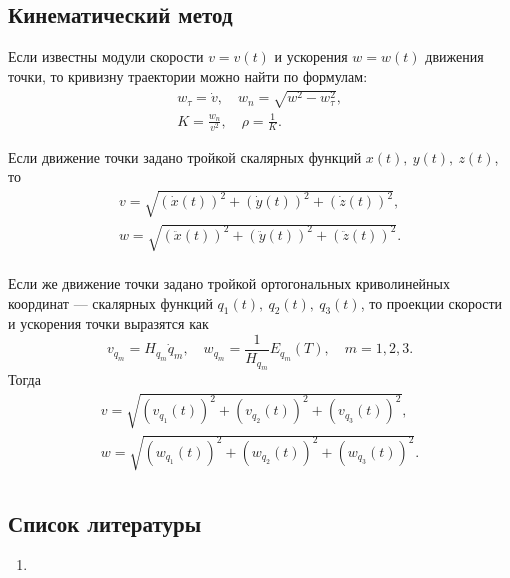 \documentclass{article}
\theoremstyle{definition}
\theoremstyle{plain}
\theoremstyle{remark}
\numberwithin{equation}{section}
\begin{document}
\subsection{Кинематический метод}

Если известны модули скорости $v = v(t)$ и ускорения $w = w(t)$ движения точки,
то кривизну траектории можно найти по формулам:
\begin{equation}
  \begin{gathered}
    w_\tau = \dot{v}, \quad w_n = \sqrt{w^2 - w_\tau^2}, \\
    K = \frac{w_n}{v^2}, \quad \rho = \frac{1}{K}.
  \end{gathered}
\end{equation}

Если движение точки задано тройкой скалярных функций $x(t),~y(t),~z(t)$, то
\begin{equation}
  \begin{gathered}
    v = \sqrt{(\dot{x}(t))^2 + (\dot{y}(t))^2 + (\dot{z}(t))^2}, \\
    w = \sqrt{(\ddot{x}(t))^2 + (\ddot{y}(t))^2 + (\ddot{z}(t))^2}. \\
  \end{gathered}
\end{equation}

Если же движение точки задано тройкой ортогональных криволинейных координат
--- скалярных функций $q_1(t),~q_2(t),~q_3(t)$, то проекции скорости и
ускорения точки выразятся как
\begin{equation*}
  v_{q_m} = H_{q_m} \dot{q}_m, \quad w_{q_m} = \frac{1}{H_{q_m}} E_{q_m} (T),
    \quad m = 1,2,3.
\end{equation*}
Тогда
\begin{equation}
  \begin{gathered}
    v = \sqrt{(v_{q_1}(t))^2 + (v_{q_2}(t))^2 + (v_{q_3}(t))^2}, \\
    w = \sqrt{(w_{q_1}(t))^2 + (w_{q_2}(t))^2 + (w_{q_3}(t))^2}. \\
  \end{gathered}
\end{equation}

\subsection{Список литературы}
\begin{enumerate}
  \item \cite{lectures}
\end{enumerate}
\end{document}
